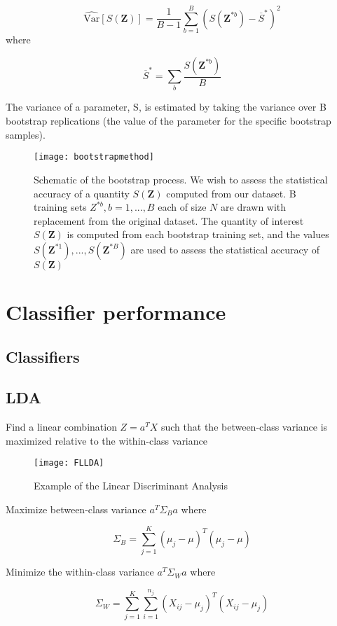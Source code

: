 \[
    \hat{\text{Var}}[S(\bm{Z})] = \frac{1}{B-1} \sum_{b=1}^{B} (S(\bm{Z}^{*b})-\overline{S}^*)^2
\]
where

\[
    \overline{S}^* = \sum_{b} \frac{S(\bm{Z}^{*b})}{B}
\]

The variance of a parameter, S, is estimated by taking the variance
over B bootstrap replications (the value of the parameter for the
specific bootstrap samples).

\begin{figure}[H]
  \centering
  \texttt{[image: bootstrapmethod]}
  \caption{Schematic of the bootstrap process. We wish to assess the statistical accuracy of a quantity $S(\bm{Z})$ computed from our dataset. B training sets $Z^{*b}, b=1,...,B$ each of size $N$ are drawn with replacement from the original dataset. The quantity of interest $S(\bm{Z})$ is computed from each bootstrap training set, and the values $S(\bm{Z}^{*1}),...,S(\bm{Z}^{*B})$ are used to assess the statistical accuracy of $S(\bm{Z})$ }\label{fig:bootstrapmethod}
\end{figure}


\section{Classifier performance}


\subsection{Classifiers}


\subsection{LDA}
Find a linear combination $Z = a^T X$ such that the between-class variance is maximized relative to the within-class variance

\begin{figure}[H]
  \centering
  \texttt{[image: FLLDA]}
  \caption{Example of the Linear Discriminant Analysis}\label{fig:FLLDA}
\end{figure}

Maximize between-class variance $a^T \Sigma_B a$ where

\[
    \Sigma_B = \sum_{j=1}^{K} (\mu_j - \mu)^T(\mu_j - \mu)
\]

Minimize the within-class variance $a^T \Sigma_W a$ where

\[
    \Sigma_W = \sum_{j=1}^{K} \sum_{i=1}^{n_j} (X_{ij} -\mu_j)^T (X_{ij} -\mu_j)
\]

